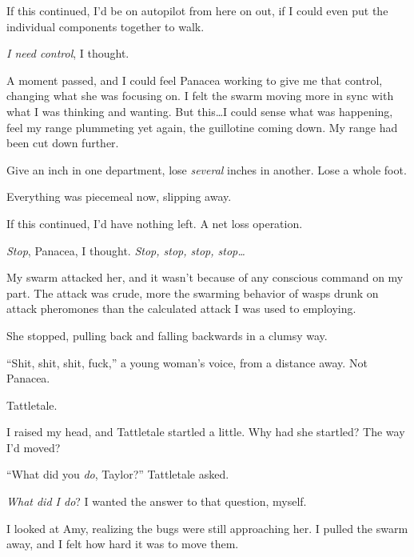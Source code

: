 If this continued, I'd be on autopilot from here on out, if I could even put the individual components together to walk.



\emph{I need control}, I thought.



A moment passed, and I could feel Panacea working to give me that control, changing what she was focusing on.  I felt the swarm moving more in sync with what I was thinking and wanting.  But this\ldots I could sense what was happening, feel my range plummeting yet again, the guillotine coming down.  My range had been cut down further.



Give an inch in one department, lose \emph{several} inches in another.  Lose a whole foot.



Everything was piecemeal now, slipping away.



If this continued, I'd have nothing left.  A net loss operation.



\emph{Stop}, Panacea, I thought.  \emph{Stop, stop, stop, stop\ldots}



My swarm attacked her, and it wasn't because of any conscious command on my part.  The attack was crude, more the swarming behavior of wasps drunk on attack pheromones than the calculated attack I was used to employing.



She stopped, pulling back and falling backwards in a clumsy way.



``Shit, shit, shit, fuck,'' a young woman's voice, from a distance away.  Not Panacea.



Tattletale.



I raised my head, and Tattletale startled a little.  Why had she startled?  The way I'd moved?



``What did you \emph{do}, Taylor?''  Tattletale asked.



\emph{What did I do}?  I wanted the answer to that question, myself.



I looked at Amy, realizing the bugs were still approaching her.  I pulled the swarm away, and I felt how hard it was to move them.



